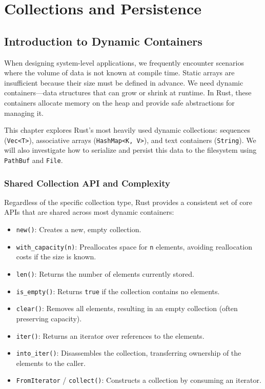 \chapter{Collections and Persistence}

\section{Introduction to Dynamic Containers}

When designing system-level applications, we frequently encounter scenarios where the volume of data is not known at compile time. Static arrays are insufficient because their size must be defined in advance. We need dynamic containers---data structures that can grow or shrink at runtime. In Rust, these containers allocate memory on the heap and provide safe abstractions for managing it.

This chapter explores Rust's most heavily used dynamic collections: sequences (\texttt{Vec<T>}), associative arrays (\texttt{HashMap<K, V>}), and text containers (\texttt{String}). We will also investigate how to serialize and persist this data to the filesystem using \texttt{PathBuf} and \texttt{File}.


\subsection{Shared Collection API and Complexity}
Regardless of the specific collection type, Rust provides a consistent set of core APIs that are shared across most dynamic containers:
\begin{itemize}
    \item \texttt{new()}: Creates a new, empty collection.
    \item \texttt{with\_capacity(n)}: Preallocates space for \texttt{n} elements, avoiding reallocation costs if the size is known.
    \item \texttt{len()}: Returns the number of elements currently stored.
    \item \texttt{is\_empty()}: Returns \texttt{true} if the collection contains no elements.
    \item \texttt{clear()}: Removes all elements, resulting in an empty collection (often preserving capacity).
    \item \texttt{iter()}: Returns an iterator over references to the elements.
    \item \texttt{into\_iter()}: Disassembles the collection, transferring ownership of the elements to the caller.
    \item \texttt{FromIterator} / \texttt{collect()}: Constructs a collection by consuming an iterator.
\end{itemize}

